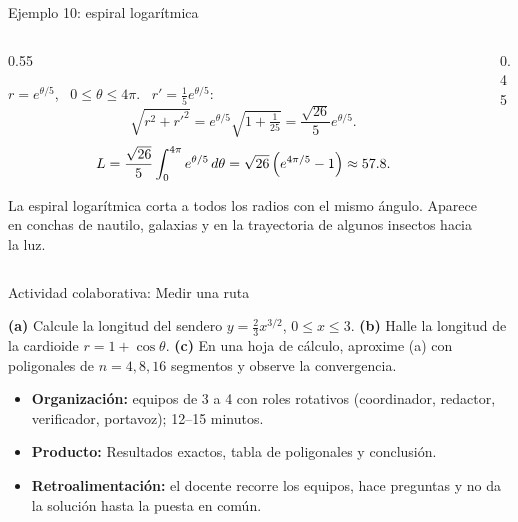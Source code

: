 \documentclass[10pt,aspectratio=169]{beamer}
\begin{document}
\begin{frame}{Ejemplo 10: espiral logarítmica}
  \begin{columns}
    \begin{column}{0.55\textwidth}
      \begin{ejemplo}
        $r=e^{\theta/5}$, \ $0\le\theta\le4\pi$. \ $r'=\frac15e^{\theta/5}$:
        \[ \sqrt{r^2+r'^2}=e^{\theta/5}\sqrt{1+\tfrac1{25}}=\frac{\sqrt{26}}{5}e^{\theta/5}. \]
        \[ L=\frac{\sqrt{26}}{5}\int_0^{4\pi}e^{\theta/5}\,d\theta=\sqrt{26}\left(e^{4\pi/5}-1\right)\approx57.8. \]
      \end{ejemplo}
      \begin{observacion}
        La espiral logarítmica corta a todos los radios con el mismo ángulo. Aparece en conchas de nautilo,
        galaxias y en la trayectoria de algunos insectos hacia la luz.
      \end{observacion}
    \end{column}
    \begin{column}{0.45\textwidth}
      \centering
    \end{column}
  \end{columns}
\end{frame}

\begin{frame}{Actividad colaborativa: Medir una ruta}
  \small
  \begin{activa}
    \textbf{(a)} Calcule la longitud del sendero $y=\frac23x^{3/2}$, $0\le x\le3$. \textbf{(b)} Halle la longitud de la cardioide $r=1+\cos\theta$. \textbf{(c)} En una hoja de cálculo, aproxime (a) con poligonales de $n=4,8,16$ segmentos y observe la convergencia.
  \end{activa}
  \begin{itemize}
    \item \textbf{Organización:} equipos de 3 a 4 con roles rotativos (coordinador, redactor, verificador, portavoz); 12--15 minutos.
    \item \textbf{Producto:} Resultados exactos, tabla de poligonales y conclusión.
    \item \textbf{Retroalimentación:} el docente recorre los equipos, hace preguntas y no da la solución hasta la puesta en común.
  \end{itemize}
\end{frame}
\end{document}
